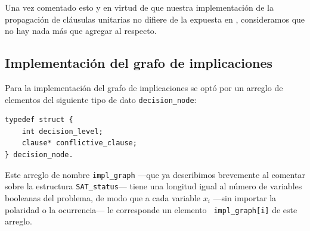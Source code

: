 \documentclass[12pt,lettersize,oneside]{article}
\begin{document}
Una vez comentado esto y en virtud de que nuestra implementación de la
propagación de cláusulas unitarias no difiere de la expuesta en \cite{Zhang},
consideramos que no hay nada más que agregar al respecto.

\subsection{Implementación del grafo de implicaciones}\label{impl}
Para la implementación del grafo de implicaciones se optó por un arreglo de
elementos del siguiente tipo de dato {\tt decision\_node}:
\begin{lstlisting}
typedef struct {
    int decision_level;
    clause* conflictive_clause;
} decision_node.
\end{lstlisting}
Este arreglo de nombre {\tt impl\_graph} ---que ya describimos brevemente al
comentar sobre la estructura {\tt SAT\_status}--- tiene una longitud igual al
número de variables booleanas del problema, de modo que a cada variable $x_i$
---sin importar la polaridad o la ocurrencia--- le corresponde un elemento {\tt
  impl\_graph[i]} de este arreglo.
\end{document}
